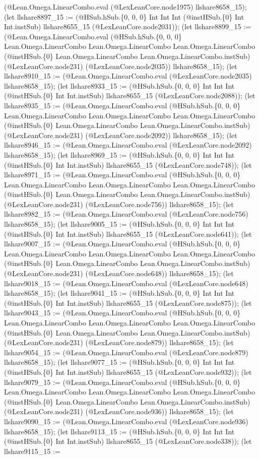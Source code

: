 \documentclass[11pt]{article}
\begin{document}
(@Lean.Omega.LinearCombo.eval (@LexLeanCore.node1975) llshare8658\_15); (let llshare8897\_15 := (@HSub.hSub.\{0, 0, 0\} Int Int Int (@instHSub.\{0\} Int Int.instSub) llshare8655\_15 (@LexLeanCore.node2031)); (let llshare8899\_15 := (@Lean.Omega.LinearCombo.eval (@HSub.hSub.\{0, 0, 0\} Lean.Omega.LinearCombo Lean.Omega.LinearCombo Lean.Omega.LinearCombo (@instHSub.\{0\} Lean.Omega.LinearCombo Lean.Omega.LinearCombo.instSub) (@LexLeanCore.node231) (@LexLeanCore.node2035)) llshare8658\_15); (let llshare8910\_15 := (@Lean.Omega.LinearCombo.eval (@LexLeanCore.node2035) llshare8658\_15); (let llshare8933\_15 := (@HSub.hSub.\{0, 0, 0\} Int Int Int (@instHSub.\{0\} Int Int.instSub) llshare8655\_15 (@LexLeanCore.node2088)); (let llshare8935\_15 := (@Lean.Omega.LinearCombo.eval (@HSub.hSub.\{0, 0, 0\} Lean.Omega.LinearCombo Lean.Omega.LinearCombo Lean.Omega.LinearCombo (@instHSub.\{0\} Lean.Omega.LinearCombo Lean.Omega.LinearCombo.instSub) (@LexLeanCore.node231) (@LexLeanCore.node2092)) llshare8658\_15); (let llshare8946\_15 := (@Lean.Omega.LinearCombo.eval (@LexLeanCore.node2092) llshare8658\_15); (let llshare8969\_15 := (@HSub.hSub.\{0, 0, 0\} Int Int Int (@instHSub.\{0\} Int Int.instSub) llshare8655\_15 (@LexLeanCore.node748)); (let llshare8971\_15 := (@Lean.Omega.LinearCombo.eval (@HSub.hSub.\{0, 0, 0\} Lean.Omega.LinearCombo Lean.Omega.LinearCombo Lean.Omega.LinearCombo (@instHSub.\{0\} Lean.Omega.LinearCombo Lean.Omega.LinearCombo.instSub) (@LexLeanCore.node231) (@LexLeanCore.node756)) llshare8658\_15); (let llshare8982\_15 := (@Lean.Omega.LinearCombo.eval (@LexLeanCore.node756) llshare8658\_15); (let llshare9005\_15 := (@HSub.hSub.\{0, 0, 0\} Int Int Int (@instHSub.\{0\} Int Int.instSub) llshare8655\_15 (@LexLeanCore.node641)); (let llshare9007\_15 := (@Lean.Omega.LinearCombo.eval (@HSub.hSub.\{0, 0, 0\} Lean.Omega.LinearCombo Lean.Omega.LinearCombo Lean.Omega.LinearCombo (@instHSub.\{0\} Lean.Omega.LinearCombo Lean.Omega.LinearCombo.instSub) (@LexLeanCore.node231) (@LexLeanCore.node648)) llshare8658\_15); (let llshare9018\_15 := (@Lean.Omega.LinearCombo.eval (@LexLeanCore.node648) llshare8658\_15); (let llshare9041\_15 := (@HSub.hSub.\{0, 0, 0\} Int Int Int (@instHSub.\{0\} Int Int.instSub) llshare8655\_15 (@LexLeanCore.node875)); (let llshare9043\_15 := (@Lean.Omega.LinearCombo.eval (@HSub.hSub.\{0, 0, 0\} Lean.Omega.LinearCombo Lean.Omega.LinearCombo Lean.Omega.LinearCombo (@instHSub.\{0\} Lean.Omega.LinearCombo Lean.Omega.LinearCombo.instSub) (@LexLeanCore.node231) (@LexLeanCore.node879)) llshare8658\_15); (let llshare9054\_15 := (@Lean.Omega.LinearCombo.eval (@LexLeanCore.node879) llshare8658\_15); (let llshare9077\_15 := (@HSub.hSub.\{0, 0, 0\} Int Int Int (@instHSub.\{0\} Int Int.instSub) llshare8655\_15 (@LexLeanCore.node932)); (let llshare9079\_15 := (@Lean.Omega.LinearCombo.eval (@HSub.hSub.\{0, 0, 0\} Lean.Omega.LinearCombo Lean.Omega.LinearCombo Lean.Omega.LinearCombo (@instHSub.\{0\} Lean.Omega.LinearCombo Lean.Omega.LinearCombo.instSub) (@LexLeanCore.node231) (@LexLeanCore.node936)) llshare8658\_15); (let llshare9090\_15 := (@Lean.Omega.LinearCombo.eval (@LexLeanCore.node936) llshare8658\_15); (let llshare9113\_15 := (@HSub.hSub.\{0, 0, 0\} Int Int Int (@instHSub.\{0\} Int Int.instSub) llshare8655\_15 (@LexLeanCore.node338)); (let llshare9115\_15 := 
\end{document}

